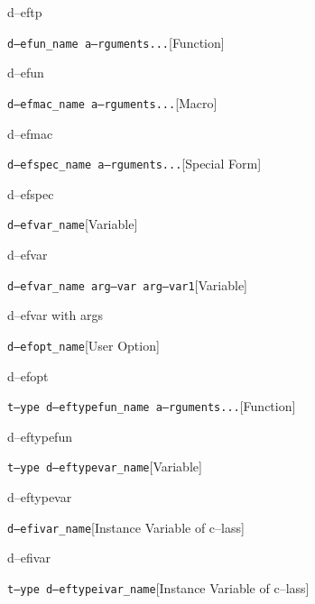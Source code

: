 \documentclass{book}
\begin{document}
\begin{titlepage}
%
d--eftp

\noindent\texttt\bgroup{}d--efun\_name a--rguments...\egroup{}\hfill[Function]



%
d--efun

\noindent\texttt\bgroup{}d--efmac\_name a--rguments...\egroup{}\hfill[Macro]



%
d--efmac

\noindent\texttt\bgroup{}d--efspec\_name a--rguments...\egroup{}\hfill[Special Form]



%
d--efspec

\noindent\texttt\bgroup{}d--efvar\_name\egroup{}\hfill[Variable]



%
d--efvar

\noindent\texttt\bgroup{}d--efvar\_name arg--var arg--var1\egroup{}\hfill[Variable]



%
d--efvar with args

\noindent\texttt\bgroup{}d--efopt\_name\egroup{}\hfill[User Option]



%
d--efopt

\noindent\texttt\bgroup{}t--ype d--eftypefun\_name a--rguments...\egroup{}\hfill[Function]



%
d--eftypefun

\noindent\texttt\bgroup{}t--ype d--eftypevar\_name\egroup{}\hfill[Variable]



%
d--eftypevar

\noindent\texttt\bgroup{}d--efivar\_name\egroup{}\hfill[Instance Variable of c--lass]



%
d--efivar

\noindent\texttt\bgroup{}t--ype d--eftypeivar\_name\egroup{}\hfill[Instance Variable of c--lass]




\end{titlepage}
\end{document}
